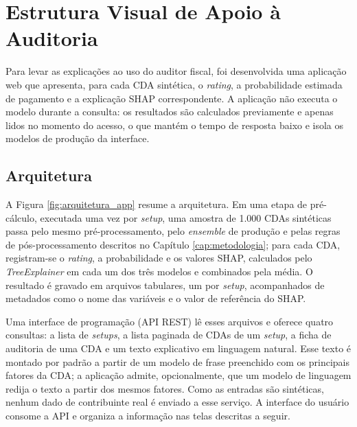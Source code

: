\section{Estrutura Visual de Apoio à Auditoria}
\label{sec:aplicacao_web}

Para levar as explicações ao uso do auditor fiscal, foi desenvolvida uma aplicação web que apresenta, para cada CDA sintética, o \textit{rating}, a probabilidade estimada de pagamento e a explicação SHAP correspondente. A aplicação não executa o modelo durante a consulta: os resultados são calculados previamente e apenas lidos no momento do acesso, o que mantém o tempo de resposta baixo e isola os modelos de produção da interface.

\subsection{Arquitetura}

A Figura \ref{fig:arquitetura_app} resume a arquitetura. Em uma etapa de pré-cálculo, executada uma vez por \textit{setup}, uma amostra de 1.000 CDAs sintéticas passa pelo mesmo pré-processamento, pelo \textit{ensemble} de produção e pelas regras de pós-processamento descritos no Capítulo \ref{cap:metodologia}; para cada CDA, registram-se o \textit{rating}, a probabilidade e os valores SHAP, calculados pelo \textit{TreeExplainer} em cada um dos três modelos e combinados pela média. O resultado é gravado em arquivos tabulares, um por \textit{setup}, acompanhados de metadados como o nome das variáveis e o valor de referência do SHAP.

Uma interface de programação (API REST) lê esses arquivos e oferece quatro consultas: a lista de \textit{setups}, a lista paginada de CDAs de um \textit{setup}, a ficha de auditoria de uma CDA e um texto explicativo em linguagem natural. Esse texto é montado por padrão a partir de um modelo de frase preenchido com os principais fatores da CDA; a aplicação admite, opcionalmente, que um modelo de linguagem redija o texto a partir dos mesmos fatores. Como as entradas são sintéticas, nenhum dado de contribuinte real é enviado a esse serviço. A interface do usuário consome a API e organiza a informação nas telas descritas a seguir.

